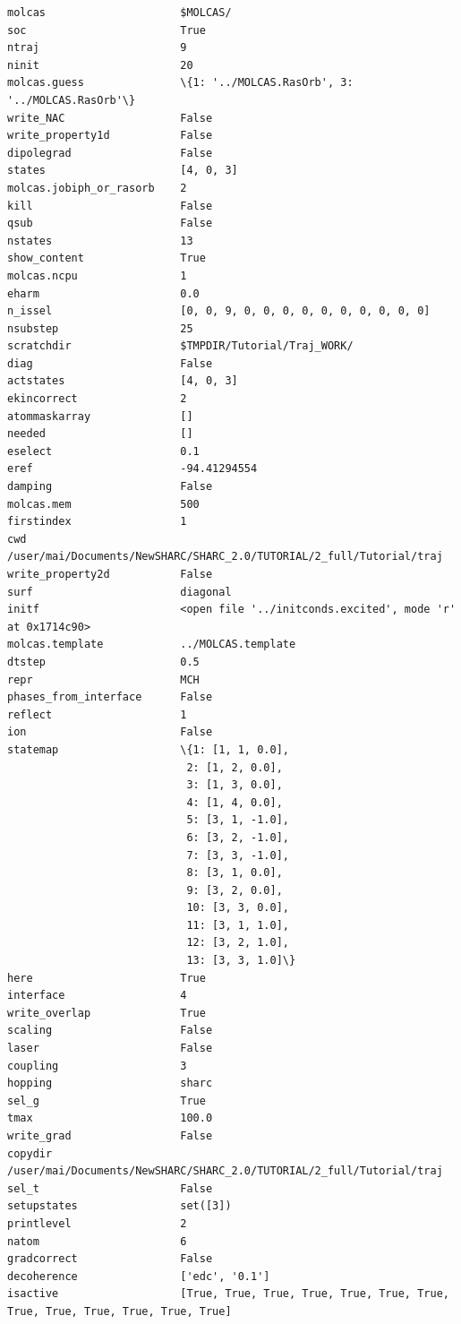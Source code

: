 \documentclass[a4paper,11pt,DIV=15,openany]{scrbook}
\begin{document}
\begin{oframed}
\begin{Verbatim}[commandchars=\\\{\}]
molcas                     $MOLCAS/
soc                        True
ntraj                      9
ninit                      20
molcas.guess               \{1: '../MOLCAS.RasOrb', 3: '../MOLCAS.RasOrb'\}
write_NAC                  False
write_property1d           False
dipolegrad                 False
states                     [4, 0, 3]
molcas.jobiph_or_rasorb    2
kill                       False
qsub                       False
nstates                    13
show_content               True
molcas.ncpu                1
eharm                      0.0
n_issel                    [0, 0, 9, 0, 0, 0, 0, 0, 0, 0, 0, 0, 0]
nsubstep                   25
scratchdir                 $TMPDIR/Tutorial/Traj_WORK/
diag                       False
actstates                  [4, 0, 3]
ekincorrect                2
atommaskarray              []
needed                     []
eselect                    0.1
eref                       -94.41294554
damping                    False
molcas.mem                 500
firstindex                 1
cwd                        /user/mai/Documents/NewSHARC/SHARC_2.0/TUTORIAL/2_full/Tutorial/traj
write_property2d           False
surf                       diagonal
initf                      <open file '../initconds.excited', mode 'r' at 0x1714c90>
molcas.template            ../MOLCAS.template
dtstep                     0.5
repr                       MCH
phases_from_interface      False
reflect                    1
ion                        False
statemap                   \{1: [1, 1, 0.0], 
                            2: [1, 2, 0.0], 
                            3: [1, 3, 0.0], 
                            4: [1, 4, 0.0], 
                            5: [3, 1, -1.0], 
                            6: [3, 2, -1.0], 
                            7: [3, 3, -1.0], 
                            8: [3, 1, 0.0], 
                            9: [3, 2, 0.0], 
                            10: [3, 3, 0.0], 
                            11: [3, 1, 1.0], 
                            12: [3, 2, 1.0], 
                            13: [3, 3, 1.0]\}
here                       True
interface                  4
write_overlap              True
scaling                    False
laser                      False
coupling                   3
hopping                    sharc
sel_g                      True
tmax                       100.0
write_grad                 False
copydir                    /user/mai/Documents/NewSHARC/SHARC_2.0/TUTORIAL/2_full/Tutorial/traj
sel_t                      False
setupstates                set([3])
printlevel                 2
natom                      6
gradcorrect                False
decoherence                ['edc', '0.1']
isactive                   [True, True, True, True, True, True, True, True, True, True, True, True, True]


\end{Verbatim}
\end{oframed}
\end{document}
